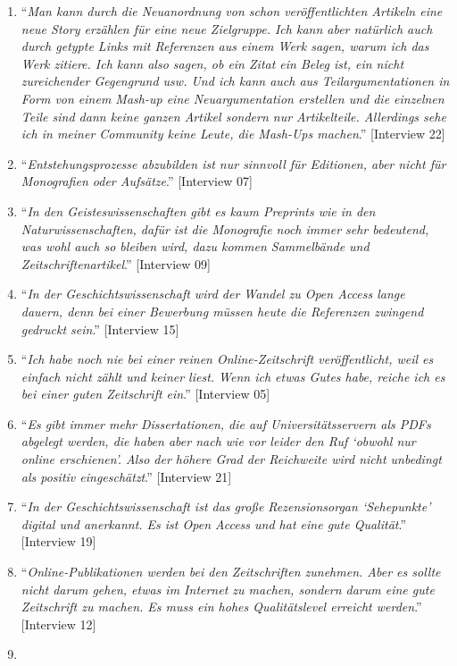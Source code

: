 \documentclass[a4paper,
fontsize=11pt,
oneside,
numbers=noperiodatend,
parskip=half-,
bibliography=totoc,
final
]{scrartcl}
\begin{document}
\begin{enumerate}
\item
  \enquote{\emph{Man kann durch die Neuanordnung von schon
  veröffentlichten Artikeln eine neue Story erzählen für eine neue
  Zielgruppe. Ich kann aber natürlich auch durch getypte Links mit
  Referenzen aus einem Werk sagen, warum ich das Werk zitiere. Ich kann
  also sagen, ob ein Zitat ein Beleg ist, ein nicht zureichender
  Gegengrund usw. Und ich kann auch aus Teilargumentationen in Form von
  einem Mash-up eine Neuargumentation erstellen und die einzelnen Teile
  sind dann keine ganzen Artikel sondern nur Artikelteile. Allerdings
  sehe ich in meiner Community keine Leute, die Mash-Ups machen}.}
  {[}Interview 22{]}
\item
  \enquote{\emph{Entstehungsprozesse abzubilden ist nur sinnvoll für
  Editionen, aber nicht für Monografien oder Aufsätze}.} {[}Interview
  07{]}
\item
  \enquote{\emph{In den Geisteswissenschaften gibt es kaum Preprints wie
  in den Naturwissenschaften, dafür ist die Monografie noch immer sehr
  bedeutend, was wohl auch so bleiben wird, dazu kommen Sammelbände und
  Zeitschriftenartikel}.} {[}Interview 09{]}
\item
  \enquote{\emph{In der Geschichtswissenschaft wird der Wandel zu Open
  Access lange dauern, denn bei einer Bewerbung müssen heute die
  Referenzen zwingend gedruckt sein}.} {[}Interview 15{]}
\item
  \enquote{\emph{Ich habe noch nie bei einer reinen Online-Zeitschrift
  veröffentlicht, weil es einfach nicht zählt und keiner liest. Wenn ich
  etwas Gutes habe, reiche ich es bei einer guten Zeitschrift ein}.}
  {[}Interview 05{]}
\item
  \enquote{\emph{Es gibt immer mehr Dissertationen, die auf
  Universitätsservern als PDFs abgelegt werden, die haben aber nach wie
  vor leider den Ruf \enquote{obwohl nur online erschienen}. Also der
  höhere Grad der Reichweite wird nicht unbedingt als positiv
  eingeschätzt}.} {[}Interview 21{]}
\item
  \enquote{\emph{In der Geschichtswissenschaft ist das große
  Rezensionsorgan \enquote{Sehepunkte} digital und anerkannt. Es ist
  Open Access und hat eine gute Qualität}.} {[}Interview 19{]}
\item
  \enquote{\emph{Online-Publikationen werden bei den Zeitschriften
  zunehmen. Aber es sollte nicht darum gehen, etwas im Internet zu
  machen, sondern darum eine gute Zeitschrift zu machen. Es muss ein
  hohes Qualitätslevel erreicht werden}.} {[}Interview 12{]}
\item

\end{enumerate}
\end{document}
